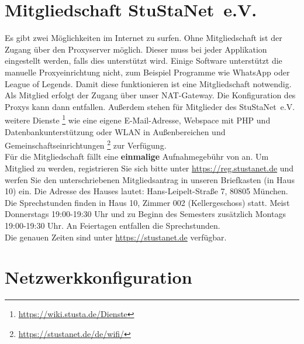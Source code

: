 \documentclass[a4paper,12pt]{scrartcl}
\begin{document}
\section{Mitgliedschaft StuStaNet~e.V.}
Es gibt zwei Möglichkeiten im Internet zu surfen. Ohne Mitgliedschaft ist der Zugang über den Proxyserver möglich. Dieser muss bei jeder Applikation eingestellt werden, falls dies unterstützt wird. Einige Software unterstützt die manuelle Proxyeinrichtung nicht, zum Beispiel Programme wie WhatsApp oder League of Legends. Damit diese funktionieren ist eine Mitgliedschaft notwendig.
\pagebreak\linebreak
Als Mitglied erfolgt der Zugang über unser NAT-Gateway. Die Konfiguration des Proxys kann dann entfallen. Außerdem stehen für Mitglieder des StuStaNet~e.V. weitere Dienste \footnote{\url{https://wiki.stusta.de/Dienste}} wie eine eigene E-Mail-Adresse, Webspace mit PHP und Datenbankunterstützung oder WLAN in Außenbereichen und Gemeinschaftseinrichtungen \footnote{\url{https://stustanet.de/de/wifi/}} zur Verfügung. 
\\
Für die Mitgliedschaft fällt eine \textbf{einmalige} Aufnahmegebühr von  an. Um Mitglied zu werden, registrieren Sie sich bitte unter \mbox{\url{https://reg.stustanet.de}} und werfen Sie den unterschriebenen Mitgliedsantrag in unseren Briefkasten (in Haus 10) ein. Die Adresse des Hauses lautet: Hans-Leipelt-Straße 7, 80805 München.
\\
Die Sprechstunden finden in Haus 10, Zimmer 002 (Kellergeschoss) statt. Meist Donnerstags 19:00-19:30 Uhr und zu Beginn des Semesters zusätzlich Montags 19:00-19:30 Uhr. An Feiertagen entfallen die Sprechstunden.
\\
Die genauen Zeiten sind unter \mbox{\url{https://stustanet.de}} verfügbar.

\section{Netzwerkkonfiguration}
\end{document}
